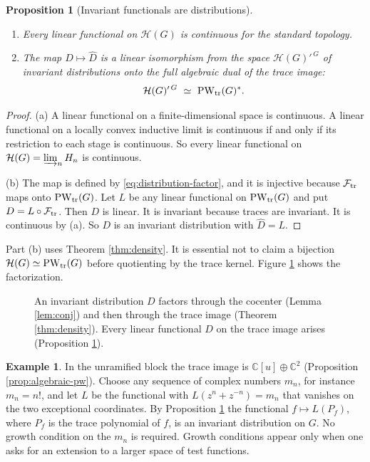 \documentclass[12pt,letterpaper]{amsart}
\numberwithin{equation}{section}
\newtheorem{proposition}[theorem]{Proposition}
\theoremstyle{definition}
\newtheorem*{example*}{Example}
\theoremstyle{remark}
\newcommand{\calH}{\mathcal H}
\newcommand{\PW}{\operatorname{PW}}
\begin{document}
\begin{proposition}[Invariant functionals are distributions]\label{prop:alg-dual}
\begin{enumerate}[label=(\alph*),leftmargin=*]
\item Every linear functional on $\calH(G)$ is continuous for the standard topology.
\item The map $D\mapsto\widehat D$ is a linear isomorphism from the space $\calH(G)'^{\,G}$ of invariant distributions onto the full algebraic dual of the trace image:
\[
\calH(G)'^{\,G}\ \simeq\ \PW_{\rm tr}(G)^* .
\]
\end{enumerate}
\end{proposition}
\begin{proof}
(a) A linear functional on a finite-dimensional space is continuous. A linear functional on a locally convex inductive limit is continuous if and only if its restriction to each stage is continuous. So every linear functional on $\calH(G)=\varinjlim_nH_n$ is continuous.

(b) The map is defined by \eqref{eq:distribution-factor}, and it is injective because $\mathcal F_{\rm tr}$ maps onto $\PW_{\rm tr}(G)$. Let $L$ be any linear functional on $\PW_{\rm tr}(G)$ and put $D=L\circ\mathcal F_{\rm tr}$. Then $D$ is linear. It is invariant because traces are invariant. It is continuous by (a). So $D$ is an invariant distribution with $\widehat D=L$.
\end{proof}
Part (b) uses Theorem \ref{thm:density}. It is essential not to claim a bijection $\calH(G)\simeq\PW_{\rm tr}(G)$ before quotienting by the trace kernel. Figure \ref{fig:factorization} shows the factorization.
\begin{figure}[htbp]\centering
{}
\caption{An invariant distribution $D$ factors through the cocenter (Lemma \ref{lem:conj}) and then through the trace image (Theorem \ref{thm:density}). Every linear functional $\widehat D$ on the trace image arises (Proposition \ref{prop:alg-dual}).}\label{fig:factorization}
\end{figure}
\begin{example*}
In the unramified block the trace image is $\mathbb C[u]\oplus\mathbb C^2$ (Proposition \ref{prop:algebraic-pw}). Choose any sequence of complex numbers $m_n$, for instance $m_n=n!$, and let $L$ be the functional with $L(z^n+z^{-n})=m_n$ that vanishes on the two exceptional coordinates. By Proposition \ref{prop:alg-dual} the functional $f\mapsto L(P_f)$, where $P_f$ is the trace polynomial of $f$, is an invariant distribution on $G$. No growth condition on the $m_n$ is required. Growth conditions appear only when one asks for an extension to a larger space of test functions.
\end{example*}
\end{document}
